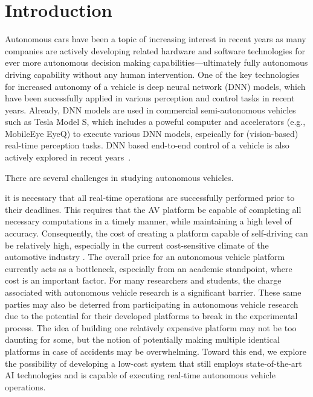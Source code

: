 \section{Introduction} \label{sec:intro}

%
%
Autonomous cars have been a topic of increasing interest in recent
years as many companies are actively developing related hardware
and software technologies for ever more autonomous decision making
capabilities---ultimately fully autonomous driving capability without
any human intervention. One of the key technologies for increased
autonomy of a vehicle is deep neural network (DNN) models, which have
been sucessfully applied in various perception and control tasks in
recent years. Already, DNN models are used in commercial
semi-autonomous vehicles such as Tesla Model S, which includes a poweful
computer and accelerators (e.g., MobileEye EyeQ) to execute various
DNN models, espeically for (vision-based) real-time perception
tasks. DNN based end-to-end control of a vehicle is also actively
explored in recent years~\cite{Bojarski2016}.

%
There are several challenges in studying autonomous vehicles.

it is necessary that all real-time operations are successfully
performed prior to their deadlines. This requires that the AV platform
be capable of completing all necessary computations in a timely
manner, while maintaining a high level of accuracy. Consequently, the
cost of creating a platform capable of self-driving can be relatively
high, especially in the current cost-sensitive climate of the
automotive industry \cite{}. The overall price for an autonomous
vehicle platform currently acts as a bottleneck, especially from an
academic standpoint, where cost is an important factor. For many
researchers and students, the charge associated with autonomous
vehicle research is a significant barrier. These same parties may also
be deterred from participating in autonomous vehicle research due to
the potential for their developed platforms to break in the
experimental process. The idea of building one relatively expensive
platform may not be too daunting for some, but the notion of
potentially making multiple identical platforms in case of accidents
may be overwhelming. Toward this end, we explore the possibility of
developing a low-cost system that still employs state-of-the-art AI
technologies and is capable of executing real-time autonomous vehicle
operations. 

